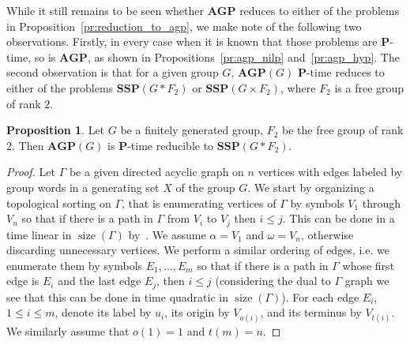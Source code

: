 \documentclass[10pt]{amsart}
\theoremstyle{definition}
\newtheorem{proposition}[theorem]{Proposition}
\DeclareMathOperator{\size}{{size}}
\def\P{{\mathbf{P}}}
\def\SSP{{\mathbf{SSP}}}
\def\AGP{{\mathbf{AGP}}}
\begin{document}
While it still remains to be seen whether $\AGP$ reduces to either of the problems in Proposition~\ref{pr:reduction_to_agp}, we make note of the following two observations. Firstly, in every case when it is known that those problems are $\P$-time, so is $\AGP$, as shown in Propositions~\ref{pr:agp_nilp} and~\ref{pr:agp_hyp}.
The second observation is that for a given group $G$, $\AGP(G)$ $\P$-time reduces to either of the problems $\SSP(G\ast F_2)$ or $\SSP(G\times F_2)$, where $F_2$ is a free group of rank $2$.

\begin{proposition}\label{pr:agp_to_ssp_star}
Let $G$ be a finitely generated group, $F_2$ be the free group of rank $2$. Then $\AGP(G)$ is $\P$-time reducible to $\SSP(G\ast F_2)$.
\end{proposition}
\begin{proof}
Let $\Gamma$ be a given directed acyclic graph on $n$ vertices with edges labeled by group words in a generating set $X$ of the group $G$. We start by organizing a topological sorting on $\Gamma$, that is enumerating vertices of $\Gamma$ by symbols $V_1$ through $V_n$ so that if there is a path in $\Gamma$ from $V_i$ to $V_j$ then $i\le j$. This can be done in a time linear in $\size(\Gamma)$ by~\cite{Kahn}. We assume $\alpha=V_1$ and $\omega=V_n$, otherwise discarding unnecessary vertices. We perform a similar ordering of edges, i.e. we enumerate them by symbols $E_1,\ldots, E_m$ so that if there is a path in $\Gamma$ whose first edge is $E_i$ and the last edge $E_j$, then $i\le j$ (considering the dual to $\Gamma$ graph we see that this can be done in time quadratic in $\size(\Gamma)$). For each edge $E_i$, $1\le i\le m$, denote its label by $u_i$, its origin by $V_{o(i)}$, and its terminus by $V_{t(i)}$. We similarly assume that $o(1)=1$ and $t(m)=n$.


\end{proof}
\end{document}
